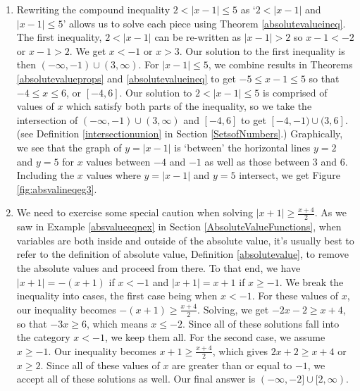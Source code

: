 {\begin{enumerate}
\item  Rewriting the compound inequality  $2 < |x-1| \leq 5$ as `$2 < |x-1|$ and $|x-1| \leq 5$' allows us to solve each piece using Theorem \ref{absolutevalueineq}.  The first inequality, $2 < |x-1|$ can be re-written as $|x-1|>2$ so $x-1 < -2$ or $x-1 > 2$.  We get $x<-1$ or $x>3$.  Our solution to the first inequality is then $(-\infty, -1) \cup (3, \infty)$.  For $|x-1| \leq 5$, we combine results in Theorems \ref{absolutevalueprops} and \ref{absolutevalueineq} to get $-5 \leq x-1 \leq 5$ so that $-4 \leq x \leq 6$, or $[-4,6]$.  Our solution to   $2 < |x-1| \leq 5$ is comprised of values of $x$ which satisfy both parts of the inequality, so we take the intersection  of $(-\infty, -1) \cup (3, \infty)$ and $[-4,6]$ to get  $[-4,-1) \cup (3,6]$.  (see Definition \ref{intersectionunion} in Section \ref{SetsofNumbers}.) Graphically, we see that the graph of $y=|x-1|$ is `between' the horizontal lines $y=2$ and $y=5$ for $x$ values between $-4$ and $-1$ as well as those between $3$ and $6$.  Including the $x$ values where $y=|x-1|$ and $y=5$ intersect, we get Figure \ref{fig:absvalineqeg3}.



\item  We need to exercise some special caution when solving $|x+1|\geq \frac{x+4}{2}$.  As we saw in Example \ref{absvalueeqnex} in Section \ref{AbsoluteValueFunctions},  when variables are both inside and outside of the absolute value, it's usually best to refer to the definition of absolute value, Definition \ref{absolutevalue}, to remove the absolute values and proceed from there.  To that end, we have $|x+1| = -(x+1)$ if $x < -1$ and $|x+1| = x+1$ if $x \geq -1$.  We break the inequality into cases, the first case being when $x<-1$.  For these values of $x$, our inequality becomes $-(x+1) \geq \frac{x+4}{2}$.  Solving, we get $-2x-2 \geq x+4$, so that $-3x \geq 6$, which means $x \leq -2$.  Since all of these solutions fall into the category $x < -1$, we keep them all.  For the second case, we assume $x \geq -1$. Our inequality becomes $x+1 \geq \frac{x+4}{2}$, which gives $2x+2 \geq x+4$ or $x \geq 2$.  Since all of these values of $x$ are greater than or equal to $-1$, we accept all of  these solutions as well.  Our final answer is  $(-\infty, -2] \cup [2,\infty)$.

\end{enumerate}
}





